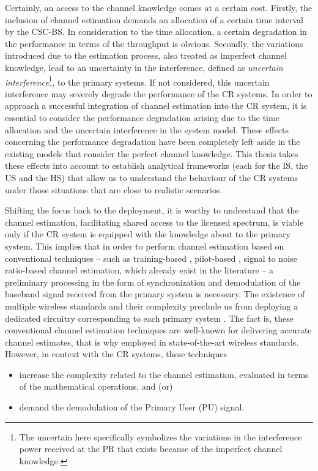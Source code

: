 Certainly, an access to the channel knowledge comes at a certain cost. Firstly, the inclusion of channel estimation demands an allocation of a certain time interval by the CSC-BS. In consideration to the time allocation, a certain degradation in the performance in terms of the throughput is obvious. Secondly, the variations introduced due to the estimation process, also treated as imperfect channel knowledge, lead to an uncertainty in the interference, defined as \textit{uncertain interference}\footnote{The uncertain here specifically symbolizes the variations in the interference power received at the PR that exists because of the imperfect channel knowledge.}, to the primary systems. If not considered, this uncertain interference may severely degrade the performance of the CR systems. In order to approach a successful integration of channel estimation into the CR system, it is essential to consider the performance degradation arising due to the time allocation and the uncertain interference in the system model. These effects concerning the performance degradation have been completely left aside in the existing models that consider the perfect channel knowledge. This thesis takes these effects into account to establish analytical frameworks (each for the IS, the US and the HS) that allow us to understand the behaviour of the CR systems under those situations that are close to realistic scenarios. %

Shifting the focus back to the deployment, it is worthy to understand that the channel estimation, facilitating shared access to the licensed spectrum, is viable only if the CR system is equipped with the knowledge about to the primary system. %
This implies that in order to perform channel estimation based on conventional techniques -- such as training-based \cite{Stoica03}, pilot-based \cite{Gifford05, Gifford08}, signal to noise ratio-based \cite{Chav11, Sharma13} channel estimation, which already exist in the literature -- a preliminary processing in the form of synchronization and demodulation of the baseband signal received from the primary system is necessary. The existence of multiple wireless standards and their complexity preclude us from deploying a dedicated circuitry corresponding to each primary system \cite{Ghasemi08_cm}. The fact is, these conventional channel estimation techniques are well-known for delivering accurate channel estimates, that is why employed in state-of-the-art wireless standards. However, in context with the CR systems, these techniques \begin{itemize} \item increase the complexity related to the channel estimation, evaluated in terms of the mathematical operations, and (or) \item demand the demodulation of the Primary User (PU) signal. \end{itemize} 

